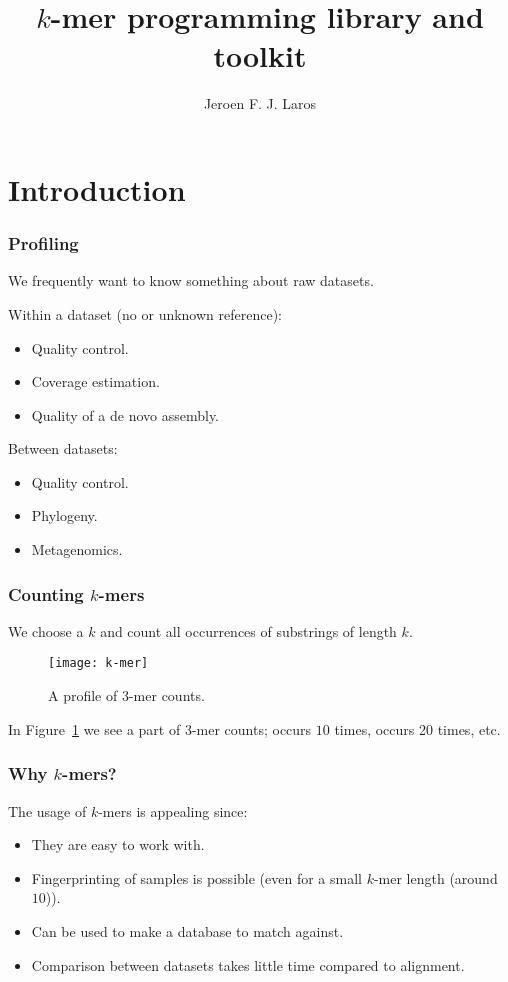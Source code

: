 \documentclass[slidestop]{beamer}
\title{$k$-mer programming library and toolkit}
\author{Jeroen F. J. Laros}
\begin{document}

\bodytemplate

\section{Introduction}
\begin{frame}
  \frametitle{Profiling}

  We frequently want to know something about raw datasets.
  \bigskip
  \pause

  Within a dataset (no or unknown reference):
  \begin{itemize}
    \item Quality control.
    \item Coverage estimation.
    \item Quality of a de novo assembly.
  \end{itemize}
  \bigskip
  \pause

  Between datasets:
  \begin{itemize}
    \item Quality control.
    \item Phylogeny.
    \item Metagenomics.
  \end{itemize}
\end{frame}

\begin{frame}
  \frametitle{Counting $k$-mers}

  We choose a $k$ and count all occurrences of substrings of length $k$.
  \pause

  \begin{figure}
    \colorbox{white}{
      \texttt{[image: k-mer]}
    }
    \vspace{-0.5cm}
    \caption{A profile of $3$-mer counts.} \label{fig:kmerprofile}
  \end{figure}

  In Figure~\ref{fig:kmerprofile} we see a part of $3$-mer counts; 
  occurs $10$ times,  occurs 20 times, etc.
\end{frame}

\begin{frame}
  \frametitle{Why $k$-mers?}

  The usage of $k$-mers is appealing since:
  \begin{itemize}
    \item They are easy to work with.
    \item Fingerprinting of samples is possible (even for a small $k$-mer
      length (around $10$)).
    \item Can be used to make a database to match against.
    \item Comparison between datasets takes little time compared to alignment.
  \end{itemize}
\end{frame}
\end{document}
